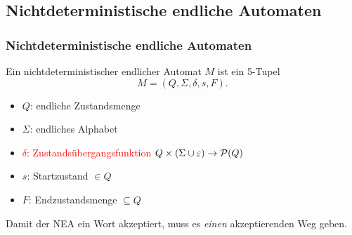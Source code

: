 \subsection{Nichtdeterministische endliche Automaten}
\begin{frame}
\frametitle{Nichtdeterministische endliche Automaten}

	\begin{minipage}{0.5 \textwidth}
        Ein nichtdeterministischer endlicher Automat $M$ ist ein 5-Tupel
        \[
        M= (Q,\Sigma,\delta,s,F).
        \]
        \begin{itemize}
        \item $Q$:  endliche Zustandsmenge
        \item $\Sigma$:    endliches Alphabet
        \item \textcolor{red}{$\delta$:   Zustandsübergangsfunktion $Q\times (\Sigma \cup \varepsilon) \rightarrow \mathcal{P}(Q)$}
        \item $s$:   Startzustand $\in Q$
        \item $F$:   Endzustandsmenge $\subseteq Q$
        \end{itemize}
\vspace{0.5cm}
	Damit der NEA ein Wort akzeptiert, muss es \emph{einen} akzeptierenden Weg geben.
	

\end{minipage}
\end{frame}
